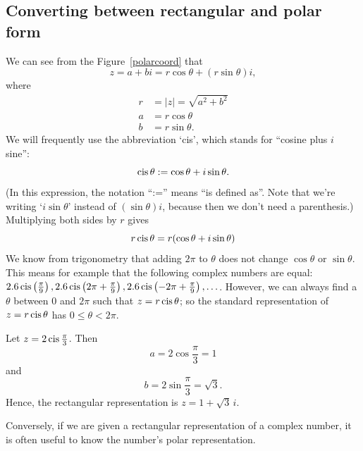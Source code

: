 \subsection{Converting between rectangular and polar form}\label{subsec:convertRecPolar}

We can see from the Figure~\ref{polarcoord} that \[
z=a+bi=r\cos\theta+( r\sin\theta) i,\]
where
\begin{align*}
r&=|z|=\sqrt{a^{2}+b^{2}} \\
a & =r\cos\theta\\
b & =r\sin\theta.\end{align*}
 We will frequently use the abbreviation `cis', which stands for ``cosine plus $i$ sine'':
\[ \operatorname{cis}\theta := \cos\theta+i\sin\theta. \]
(In this expression, the notation ``:='' means ``is defined as''. Note that we're writing `$i\sin\theta$' instead of $(\sin \theta) i$, because then we don't need a parenthesis.) 
Multiplying both sides by $r$ gives
\[ r\operatorname{cis}\theta = r(\cos\theta+i\sin\theta)\]
We know from trigonometry that adding $2 \pi$ to $\theta$ does not change $\cos \theta$ or $\sin \theta$. This means for example that the following complex numbers are equal: $2.6 \operatorname{cis}\left(\frac{\pi}{9}\right), 2.6 \operatorname{cis}\left(2\pi + \frac{\pi}{9}\right), 2.6 \operatorname{cis}\left(-2\pi + \frac{\pi}{9}\right), \ldots $.  However, we can always find a $\theta$ between $0$ and $2\pi$ such that $z = r \operatorname{cis} \theta$;  so the standard representation of $z = r \operatorname{cis} \theta$ has $0 \leq \theta < 2\pi$.

\begin{example}{1} Let $z=2\operatorname{cis} \frac{\pi}{3}$. Then
\[
a=2\cos \frac{\pi}{3}=1\]
 and \[
b=2\sin \frac{\pi}{3}=\sqrt{3}.\]
 Hence, the rectangular representation is $z=1+\sqrt{3}\, i$.
\end{example}
Conversely, if we are given a rectangular representation of a complex
number, it is often useful to know the number's polar representation.

